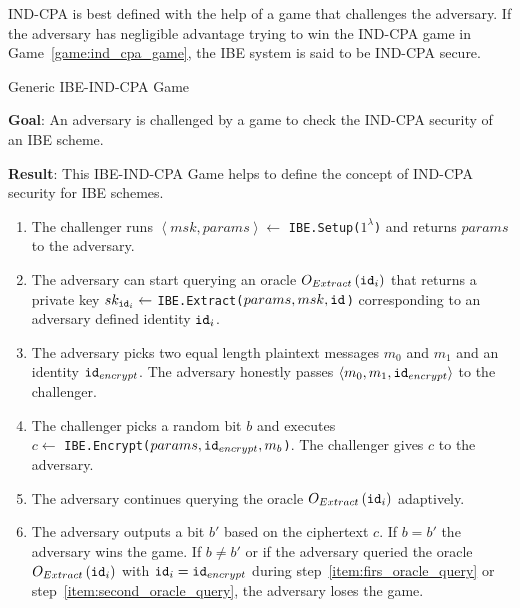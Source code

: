 IND-CPA is best defined with the help of a game that challenges the adversary. If the adversary has negligible advantage trying to win the IND-CPA game in Game~\ref{game:ind_cpa_game}, the IBE system is said to be IND-CPA secure.

\begin{game}
\caption{Generic IBE-IND-CPA Game~\cite{thesis:Alfredo08}}
\label{game:ind_cpa_game}
\begin{description}
 \item \textbf{Goal}: An adversary is challenged by a game to check the IND-CPA security of an IBE scheme.
 
 \item \textbf{Result}: This IBE-IND-CPA Game helps to define the concept of IND-CPA security for IBE schemes.
\end{description}

 \begin{enumerate}
  \item The challenger runs $\left< msk, params\right> \leftarrow$ \texttt{IBE.Setup($1^{\lambda}$)} and returns $params$ to the adversary.
  \item \label{item:firs_oracle_query} The adversary can start querying an oracle $O_{Extract} \left( \mathtt{id}_{i} \right)$ that returns a private key $sk_{\mathtt{id}_{i}} \leftarrow$ \texttt{IBE.Extract($params, msk, \mathtt{id}_{}$)} corresponding to an adversary defined identity $\mathtt{id}_{i}$.
  \item The adversary picks two equal length plaintext messages $m_0$ and $m_1$ and an identity $\mathtt{id}_{encrypt}$. The adversary honestly passes $\left< m_0, m_1, \mathtt{id}_{encrypt} \right>$ to the challenger.
  \item The challenger picks a random bit $b$ and executes \\ $c \leftarrow$ \texttt{IBE.Encrypt($params, \mathtt{id}_{encrypt}, m_b$)}. The challenger gives $c$ to the adversary.
  \item \label{item:second_oracle_query} The adversary continues querying the oracle $O_{Extract} \left( \mathtt{id}_{i} \right)$ adaptively.
  \item The adversary outputs a bit $b'$ based on the ciphertext $c$. If $b = b'$ the adversary wins the game. If $b \neq b'$ or if the adversary queried the oracle $O_{Extract} \left( \mathtt{id}_{i} \right)$ with $\mathtt{id}_{i} = \mathtt{id}_{encrypt}$ during step~\ref{item:firs_oracle_query} or step~\ref{item:second_oracle_query}, the adversary loses the game.
 \end{enumerate}
\end{game}

